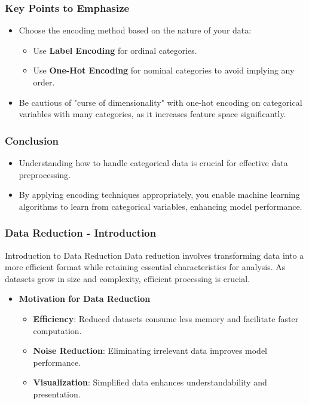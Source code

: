 \documentclass[aspectratio=169]{beamer}
\begin{document}
\begin{frame}
    \frametitle{Key Points to Emphasize}
    \begin{itemize}
        \item Choose the encoding method based on the nature of your data:
        \begin{itemize}
            \item Use \textbf{Label Encoding} for ordinal categories.
            \item Use \textbf{One-Hot Encoding} for nominal categories to avoid implying any order.
        \end{itemize}
        \item Be cautious of "curse of dimensionality" with one-hot encoding on categorical variables with many categories, as it increases feature space significantly.
    \end{itemize}
\end{frame}

\begin{frame}
    \frametitle{Conclusion}
    \begin{itemize}
        \item Understanding how to handle categorical data is crucial for effective data preprocessing.
        \item By applying encoding techniques appropriately, you enable machine learning algorithms to learn from categorical variables, enhancing model performance.
    \end{itemize}
\end{frame}

\begin{frame}[fragile]
    \frametitle{Data Reduction - Introduction}
    \begin{block}{Introduction to Data Reduction}
        Data reduction involves transforming data into a more efficient format while retaining essential characteristics for analysis. As datasets grow in size and complexity, efficient processing is crucial.
    \end{block}

    \begin{itemize}
        \item \textbf{Motivation for Data Reduction}
        \begin{itemize}
            \item \textbf{Efficiency}: Reduced datasets consume less memory and facilitate faster computation.
            \item \textbf{Noise Reduction}: Eliminating irrelevant data improves model performance.
            \item \textbf{Visualization}: Simplified data enhances understandability and presentation.
        \end{itemize}
    \end{itemize}
\end{frame}
\end{document}
